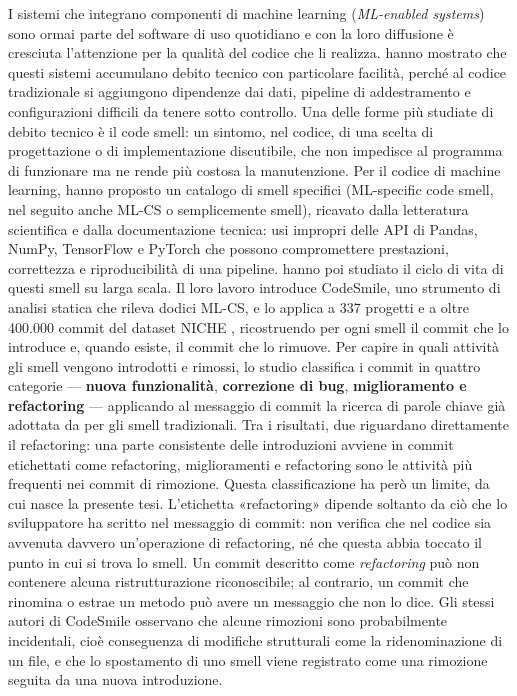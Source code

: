 I sistemi che integrano componenti di machine learning (\textit{ML-enabled systems}) sono ormai parte del software di uso quotidiano e con la loro diffusione è cresciuta l'attenzione per la qualità del codice che li realizza. \cite{hidden_tech_debt} hanno mostrato che questi sistemi accumulano debito tecnico con particolare facilità, perché al codice tradizionale si aggiungono dipendenze dai dati, pipeline di addestramento e configurazioni difficili da tenere sotto controllo. Una delle forme più studiate di debito tecnico è il code smell: un sintomo, nel codice, di una scelta di progettazione o di implementazione discutibile, che non impedisce al programma di funzionare ma ne rende più costosa la manutenzione.
Per il codice di machine learning, \cite{code_smells_definitions} hanno proposto un catalogo di smell specifici (ML-specific code smell, nel seguito anche ML-CS o semplicemente smell), ricavato dalla letteratura scientifica e dalla documentazione tecnica: usi impropri delle API di Pandas, NumPy, TensorFlow e PyTorch che possono compromettere prestazioni, correttezza e riproducibilità di una pipeline. \cite{ml_specific_gib} hanno poi studiato il ciclo di vita di questi smell su larga scala. Il loro lavoro introduce CodeSmile, uno strumento di analisi statica che rileva dodici ML-CS, e lo applica a 337 progetti e a oltre 400.000 commit del dataset NICHE \cite{niche}, ricostruendo per ogni smell il commit che lo introduce e, quando esiste, il commit che lo rimuove.
Per capire in quali attività gli smell vengono introdotti e rimossi, lo studio classifica i commit in quattro categorie — \textbf{nuova funzionalità}, \textbf{correzione di bug}, \textbf{miglioramento e refactoring} — applicando al messaggio di commit la ricerca di parole chiave già adottata da \cite{smells_bad} per gli smell tradizionali. Tra i risultati, due riguardano direttamente il refactoring: una parte consistente delle introduzioni avviene in commit etichettati come refactoring, miglioramenti e refactoring sono le attività più frequenti nei commit di rimozione.
Questa classificazione ha però un limite, da cui nasce la presente tesi. L'etichetta «refactoring» dipende soltanto da ciò che lo sviluppatore ha scritto nel messaggio di commit: non verifica che nel codice sia avvenuta davvero un'operazione di refactoring, né che questa abbia toccato il punto in cui si trova lo smell. Un commit descritto come \textit{refactoring} può non contenere alcuna ristrutturazione riconoscibile; al contrario, un commit che rinomina o estrae un metodo può avere un messaggio che non lo dice. Gli stessi autori di CodeSmile osservano che alcune rimozioni sono probabilmente incidentali, cioè conseguenza di modifiche strutturali come la ridenominazione di un file, e che lo spostamento di uno smell viene registrato come una rimozione seguita da una nuova introduzione.
